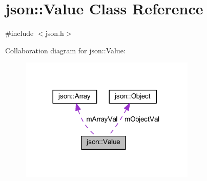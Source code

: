 \section{json\+:\+:Value Class Reference}
\label{classjson_1_1_value}


{\ttfamily \#include $<$json.\+h$>$}



Collaboration diagram for json\+:\+:Value\+:
\nopagebreak
\begin{figure}[H]
\begin{center}
\leavevmode
\includegraphics[width=237pt]{classjson_1_1_value__coll__graph}
\end{center}
\end{figure}

